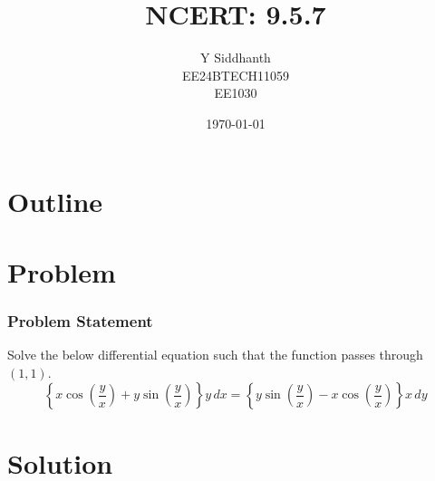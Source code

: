 \documentclass{beamer}
\title{NCERT: 9.5.7}
\author{Y Siddhanth \\ EE24BTECH11059\\ EE1030}
\date{\today}
\providecommand{\brak}[1]{\ensuremath{\left(#1\right)}}
\theoremstyle{remark}
\numberwithin{equation}{section}
\begin{document}
\begin{frame}
\titlepage
\end{frame}

\section*{Outline}
\begin{frame}
\tableofcontents
\end{frame}
\section{Problem}
\begin{frame}
\frametitle{Problem Statement}
Solve the below differential equation such that the function passes through $\brak{1,1}$.\[
\left\{ x \cos\left(\frac{y}{x}\right) + y \sin\left(\frac{y}{x}\right) \right\} y \, dx = 
\left\{ y \sin\left(\frac{y}{x}\right) - x \cos\left(\frac{y}{x}\right) \right\} x \, dy
\]
\end{frame}

\section{Solution}
\end{document}

